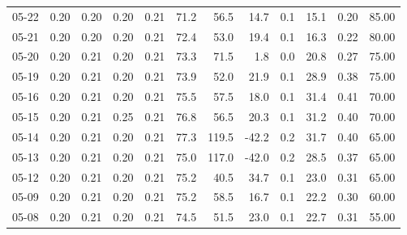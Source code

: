 \begin{threeparttable}
{\begin{tabular}{lrrrrrrrrrrr}
  05-22 &          0.20 &          0.20 &          0.20 &        0.21 &                71.2 &                56.5 &       14.7 &                 0.1 &             15.1 &            0.20 &                  85.00 \\
  05-21 &          0.20 &          0.20 &          0.20 &        0.21 &                72.4 &                53.0 &       19.4 &                 0.1 &             16.3 &            0.22 &                  80.00 \\
  05-20 &          0.20 &          0.21 &          0.20 &        0.21 &                73.3 &                71.5 &        1.8 &                 0.0 &             20.8 &            0.27 &                  75.00 \\
  05-19 &          0.20 &          0.21 &          0.20 &        0.21 &                73.9 &                52.0 &       21.9 &                 0.1 &             28.9 &            0.38 &                  75.00 \\
  05-16 &          0.20 &          0.21 &          0.20 &        0.21 &                75.5 &                57.5 &       18.0 &                 0.1 &             31.4 &            0.41 &                  70.00 \\
  05-15 &          0.20 &          0.21 &          0.25 &        0.21 &                76.8 &                56.5 &       20.3 &                 0.1 &             31.2 &            0.40 &                  70.00 \\
  05-14 &          0.20 &          0.21 &          0.20 &        0.21 &                77.3 &               119.5 &      -42.2 &                 0.2 &             31.7 &            0.40 &                  65.00 \\
  05-13 &          0.20 &          0.21 &          0.20 &        0.21 &                75.0 &               117.0 &      -42.0 &                 0.2 &             28.5 &            0.37 &                  65.00 \\
  05-12 &          0.20 &          0.21 &          0.20 &        0.21 &                75.2 &                40.5 &       34.7 &                 0.1 &             23.0 &            0.31 &                  65.00 \\
  05-09 &          0.20 &          0.21 &          0.20 &        0.21 &                75.2 &                58.5 &       16.7 &                 0.1 &             22.2 &            0.30 &                  60.00 \\
  05-08 &          0.20 &          0.21 &          0.20 &        0.21 &                74.5 &                51.5 &       23.0 &                 0.1 &             22.7 &            0.31 &                  55.00 \\

\end{tabular}}
\end{threeparttable}
